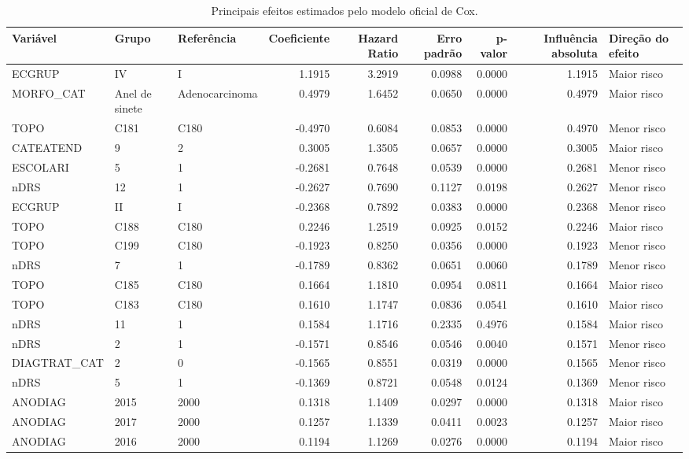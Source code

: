 \begin{table}
\caption{Principais efeitos estimados pelo modelo oficial de Cox.}
\label{tab:cox_official_effects}
\begin{tabular}{lllrrrrrl}
\toprule
Variável & Grupo & Referência & Coeficiente & Hazard Ratio & Erro padrão & p-valor & Influência absoluta & Direção do efeito \\
\midrule
ECGRUP & IV & I & 1.1915 & 3.2919 & 0.0988 & 0.0000 & 1.1915 & Maior risco \\
MORFO_CAT & Anel de sinete & Adenocarcinoma & 0.4979 & 1.6452 & 0.0650 & 0.0000 & 0.4979 & Maior risco \\
TOPO & C181 & C180 & -0.4970 & 0.6084 & 0.0853 & 0.0000 & 0.4970 & Menor risco \\
CATEATEND & 9 & 2 & 0.3005 & 1.3505 & 0.0657 & 0.0000 & 0.3005 & Maior risco \\
ESCOLARI & 5 & 1 & -0.2681 & 0.7648 & 0.0539 & 0.0000 & 0.2681 & Menor risco \\
nDRS & 12 & 1 & -0.2627 & 0.7690 & 0.1127 & 0.0198 & 0.2627 & Menor risco \\
ECGRUP & II & I & -0.2368 & 0.7892 & 0.0383 & 0.0000 & 0.2368 & Menor risco \\
TOPO & C188 & C180 & 0.2246 & 1.2519 & 0.0925 & 0.0152 & 0.2246 & Maior risco \\
TOPO & C199 & C180 & -0.1923 & 0.8250 & 0.0356 & 0.0000 & 0.1923 & Menor risco \\
nDRS & 7 & 1 & -0.1789 & 0.8362 & 0.0651 & 0.0060 & 0.1789 & Menor risco \\
TOPO & C185 & C180 & 0.1664 & 1.1810 & 0.0954 & 0.0811 & 0.1664 & Maior risco \\
TOPO & C183 & C180 & 0.1610 & 1.1747 & 0.0836 & 0.0541 & 0.1610 & Maior risco \\
nDRS & 11 & 1 & 0.1584 & 1.1716 & 0.2335 & 0.4976 & 0.1584 & Maior risco \\
nDRS & 2 & 1 & -0.1571 & 0.8546 & 0.0546 & 0.0040 & 0.1571 & Menor risco \\
DIAGTRAT_CAT & 2 & 0 & -0.1565 & 0.8551 & 0.0319 & 0.0000 & 0.1565 & Menor risco \\
nDRS & 5 & 1 & -0.1369 & 0.8721 & 0.0548 & 0.0124 & 0.1369 & Menor risco \\
ANODIAG & 2015 & 2000 & 0.1318 & 1.1409 & 0.0297 & 0.0000 & 0.1318 & Maior risco \\
ANODIAG & 2017 & 2000 & 0.1257 & 1.1339 & 0.0411 & 0.0023 & 0.1257 & Maior risco \\
ANODIAG & 2016 & 2000 & 0.1194 & 1.1269 & 0.0276 & 0.0000 & 0.1194 & Maior risco \\

\end{tabular}
\end{table}
